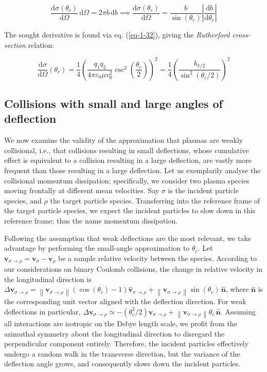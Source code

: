 \begin{equation}
    \frac{\mathrm{d}\sigma(\theta_c)}{\mathrm{d}\Omega}\,\mathrm{d}\Omega=2\pi b\,\mathrm{d}b\implies\frac{\mathrm{d}\sigma(\theta_c)}{\mathrm{d}\Omega}=\frac{b}{\sin(\theta_c)}\left|\frac{\mathrm{d}b}{\mathrm{d}\theta_c}\right|
\end{equation}

The sought derivative is found via eq. (\ref{eq-1-32}), giving the \textit{Rutherford cross-section} relation:

\begin{equation}
    \frac{\mathrm{d}\sigma}{\mathrm{d}\Omega}(\theta_c)=\frac{1}{4}\left(\frac{q_1q_2}{4\pi\varepsilon_0\mu v_0^2}\csc^2\left(\frac{\theta_c}{2}\right)\right)^2=\frac{1}{4}\left(\frac{b_{\pi/2}}{\sin^2(\theta_c/2)}\right)^2
\end{equation}

\subsection{Collisions with small and large angles of deflection}

We now examine the validity of the approximation that plasmas are weakly collisional, i.e., that collisions resulting in small deflections, whose cumulative effect is equivalent to a collision resulting in a large deflection, are vastly more frequent than those resulting in a large deflection. Let us exemplarily analyse the collisional momentum dissipation; specifically, we consider two plasma species moving frontally at different mean velocities. Say $\sigma$ is the incident particle species, and $\rho$ the target particle species. Transferring into the reference frame of the target particle species, we expect the incident particles to slow down in this reference frame; thus the name momentum dissipation.

\quad Following the assumption that weak deflections are the most relevant, we take advantage by performing the small-angle approximation to $\theta_c$. Let $\mathbf{v}_{\sigma\to\rho}=\mathbf{v}_\sigma - \mathbf{v}_\rho$ be a sample relative velocity between the species. According to our considerations on binary Coulomb collisions, the change in relative velocity in the longitudinal direction is $\Delta \mathbf{v}_{\sigma\to\rho}=\left\|\mathbf{v}_{\sigma\to\rho}\right\|\left(\cos{\left(\theta_c\right)}-1\right)\mathbf{\hat{v}}_{\sigma\to\rho} + \left\|\mathbf{v}_{\sigma\to\rho}\right\|\sin{\left(\theta_c\right)}\,\mathbf{\hat{n}}$, where $\mathbf{\hat{n}}$ is the corresponding unit vector aligned with the deflection direction. For weak deflections in particular, $\Delta \mathbf{v}_{\sigma\to\rho}\simeq-\left({\theta_c^2}/{2}\right)\mathbf{v}_{\sigma\to\rho}+\left\|\mathbf{v}_{\sigma\to\rho}\right\|\theta_c\,\mathbf{\hat{n}}$. Assuming all interactions are isotropic on the Debye length scale, we profit from the azimuthal symmetry about the longitudinal direction to disregard the perpendicular component entirely. Therefore, the incident particles effectively undergo a random walk in the transverse direction, but the variance of the deflection angle grows, and consequently slows down the incident particles.

